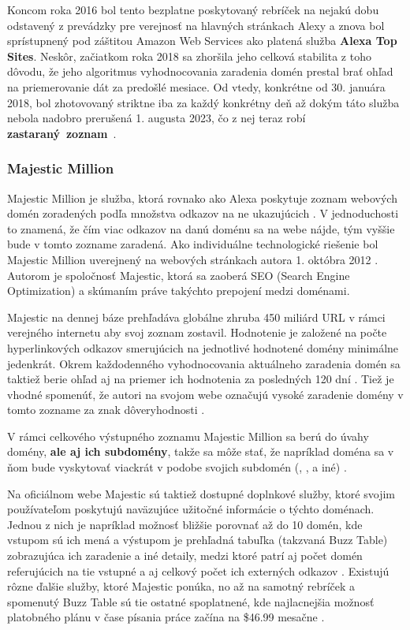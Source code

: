 Koncom roka 2016 bol tento bezplatne poskytovaný rebríček na nejakú dobu odstavený z prevádzky pre verejnosť na hlavných stránkach Alexy a znova bol sprístupnený pod záštitou Amazon Web Services ako platená služba \textbf{Alexa Top Sites}. 
Neskôr, začiatkom roka 2018 sa zhoršila jeho celková stabilita z toho dôvodu, že jeho algoritmus vyhodnocovania zaradenia domén prestal brať ohľad na priemerovanie dát za predošlé mesiace.
Od vtedy, konkrétne od 30. januára 2018, bol zhotovovaný striktne iba za každý konkrétny deň \cite{tranco} až dokým táto služba nebola nadobro prerušená 1. augusta 2023, čo z nej teraz robí \mbox{\textbf{zastaraný zoznam} \cite{tranco-methodology}}.

\subsubsection{Majestic Million}

Majestic Million je služba, ktorá rovnako ako Alexa poskytuje zoznam webových domén zoradených podľa množstva odkazov na ne ukazujúcich \cite{majestic-million-homepage, majestic-million-ranking}.
V jednoduchosti to znamená, že čím viac odkazov na danú doménu sa na webe nájde, tým vyššie bude v tomto zozname zaradená. 
Ako individuálne technologické riešenie bol Majestic Million uverejnený na webových stránkach autora 1. októbra 2012 \cite{majestic-million-publication}.
Autorom je spoločnosť Majestic, ktorá sa zaoberá SEO (Search Engine Optimization) a skúmaním práve takýchto prepojení medzi doménami.

Majestic na dennej báze prehľadáva globálne zhruba 450 miliárd URL v rámci verejného internetu aby svoj zoznam zostavil. 
Hodnotenie je založené na počte hyperlinkových odkazov smerujúcich na jednotlivé hodnotené domény minimálne jedenkrát.
Okrem každodenného vyhodnocovania aktuálneho zaradenia domén sa taktiež berie ohľad aj na priemer ich hodnotenia za posledných 120 dní \cite{tranco-methodology}.
Tiež je vhodné spomenúť, že autori na svojom webe označujú vysoké zaradenie domény v tomto zozname za znak dôveryhodnosti \cite{majestic-million-homepage}.

V rámci celkového výstupného zoznamu Majestic Million sa berú do úvahy domény, \textbf{ale aj ich subdomény}, takže sa môže stať, že napríklad doména  
sa v ňom bude vyskytovať viackrát v podobe svojich subdomén (, ,  a iné) \cite{majestic-million-sub-domain-filtered}.

Na oficiálnom webe Majestic sú taktiež dostupné doplnkové služby, ktoré svojim používateľom poskytujú naväzujúce užitočné informácie o týchto doménach. 
Jednou z nich je napríklad možnosť bližšie porovnať až do 10 domén, kde vstupom sú ich mená a výstupom je prehľadná tabuľka (takzvaná Buzz Table) zobrazujúca ich zaradenie a iné detaily, medzi ktoré patrí aj počet domén
referujúcich na tie vstupné a aj celkový počet ich externých odkazov \cite{majestic-million-homepage}.
Existujú rôzne ďalšie služby, ktoré Majestic ponúka, no až na samotný rebríček a spomenutý Buzz Table sú tie ostatné spoplatnené, kde najlacnejšia možnosť platobného plánu v čase písania práce začína na \$46.99 mesačne \cite{majestic-million-pricing}.

